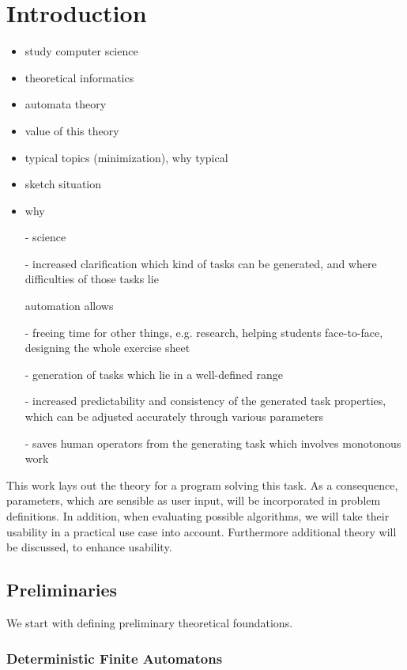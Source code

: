 
\chapter{Introduction}

\begin{itemize}
	\item study computer science
	\item theoretical informatics
	\item automata theory
	\item value of this theory
	\item typical topics (minimization), why typical
	\item sketch situation
	\item why
	
	- science
	
	- increased clarification which kind of tasks can be generated, and where difficulties of those tasks lie
	
	automation allows
	
	- freeing time for other things, e.g. research, helping students face-to-face, designing the whole exercise sheet
	
	- generation of tasks which lie in a well-defined range
	
	- increased predictability and consistency of the generated task properties, which can be adjusted accurately through various parameters
	
	- saves human operators from the generating task which involves monotonous work
\end{itemize}

This work lays out the theory for a program solving this task. As a consequence, parameters, which are sensible as user input, will be incorporated in problem definitions.
In addition, when evaluating possible algorithms, we will take their usability in a practical use case into account.
Furthermore additional theory will be discussed, to enhance usability.

\section{Preliminaries}

We start with defining preliminary theoretical foundations.

\subsection{Deterministic Finite Automatons}

